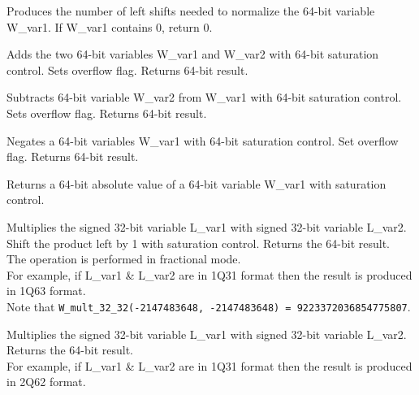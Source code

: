 
Produces the number of left shifts needed to normalize the 64-bit variable W\_var1.
If W\_var1 contains 0, return 0.


Adds the two 64-bit variables W\_var1 and W\_var2 with 64-bit saturation control.
Sets overflow flag. Returns 64-bit result.


Subtracts 64-bit variable W\_var2 from W\_var1 with 64-bit saturation control.
Sets overflow flag. Returns 64-bit result.


Negates a 64-bit variables W\_var1 with 64-bit saturation control.
Set overflow flag. Returns 64-bit result.


Returns a 64-bit absolute value of a 64-bit variable W\_var1 with saturation control.


Multiplies the signed 32-bit variable L\_var1 with signed 32-bit variable L\_var2.
Shift the product left by 1 with saturation control.
Returns the 64-bit result.\\
The operation is performed in fractional mode.\\
For example, if L\_var1 \& L\_var2 are in 1Q31 format then the result is produced in 1Q63 format.\\
Note that {\tt W\_mult\_32\_32(-2147483648, -2147483648) = 9223372036854775807}.


Multiplies the signed 32-bit variable L\_var1 with signed 32-bit variable L\_var2.
Returns the 64-bit result.\\
For example, if L\_var1 \& L\_var2 are in 1Q31 format then the result is produced in 2Q62 format.


